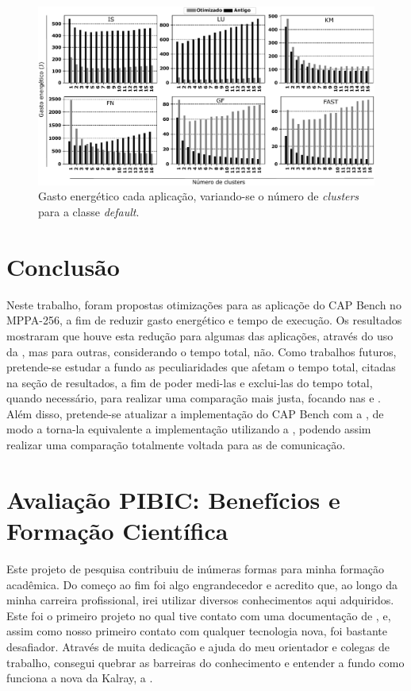 \documentclass[a4paper,11pt]{article}
\newcommand{\mppa}{MPPA-256\xspace}
\newcommand{\capb}{CAP Bench\xspace}
\begin{document}
\begin{figure}[h]
\centering
\includegraphics[width=15cm, keepaspectratio]{figs/power.pdf}
\caption{Gasto energético cada aplicação, variando-se o número de \textit{clusters} para a classe \textit{default}.}\par
\label{fig:executiontime}
\end{figure}

\section{Conclusão}
\label{sec:conclusao}

Neste trabalho, foram propostas otimizações para as aplicaçõe do \capb no \mppa, a fim de reduzir gasto energético e tempo de execução. Os resultados mostraram que houve esta redução para algumas das aplicações, através do uso da \async, mas para outras, considerando o tempo total, não. Como trabalhos futuros, pretende-se estudar a fundo as peculiaridades que afetam o tempo total, citadas na seção de resultados, a fim de poder medi-las e exclui-las do tempo total, quando necessário, para realizar uma comparação mais justa, focando nas \apis \async e \ipc. Além disso, pretende-se atualizar a implementação do \capb com a \api \ipc, de modo a torna-la equivalente a implementação utilizando a \async, podendo assim realizar uma comparação totalmente voltada para as \apis de comunicação.

\section{Avaliação PIBIC: Benefícios e Formação Científica}

Este projeto de pesquisa contribuiu de inúmeras formas para minha formação acadêmica. Do começo ao fim foi algo engrandecedor e acredito que, ao longo da minha carreira profissional, irei utilizar diversos conhecimentos aqui adquiridos. Este foi o primeiro projeto no qual tive contato com uma documentação de \api, e, assim como nosso primeiro contato com qualquer tecnologia nova, foi bastante desafiador. Através de muita dedicação e ajuda do meu orientador e colegas de trabalho, consegui quebrar as barreiras do conhecimento e entender a fundo como funciona a nova \api da Kalray, a \async.  
\end{document}

